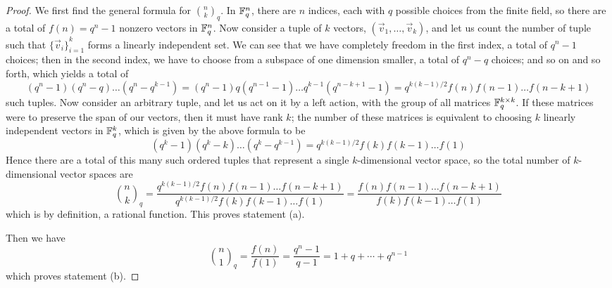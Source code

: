 \begin{proof}
    We first find the general formula for \(\binom{n}{k}_q\).
    In \(\mathbb{F}_q^n\), there are \(n\) indices, each with \(q\) possible choices from the finite field,
    so there are a total of \(f(n) = q^n - 1\) nonzero vectors in \(\mathbb{F}_q^n\).
    Now consider a tuple of \(k\) vectors, \((\vec{v}_1,\hdots,\vec{v}_k)\),
    and let us count the number of tuple
    such that \({\{\vec{v}_i\}}_{i=1}^k\) forms a linearly independent set.
    We can see that we have completely freedom in the first index, a total of \(q^n - 1\) choices;
    then in the second index, we have to choose from a subspace of one dimension smaller,
    a total of \(q^n - q\) choices;
    and so on and so forth, which yields a total of
    \begin{equation*}
        (q^n - 1)(q^n - q)\hdots(q^n - q^{k-1})
        = (q^n - 1) q(q^{n-1} - 1) \hdots q^{k-1}(q^{n-k+1} - 1)
        = q^{k(k-1)/2} f(n)f(n-1) \hdots f(n-k+1)
    \end{equation*}
    such tuples.
    Now consider an arbitrary tuple,
    and let us act on it by a left action,
    with the group of all matrices \(\mathbb{F}_q^{k \times k}\).
    If these matrices were to preserve the span of our vectors,
    then it must have rank \(k\);
    the number of these matrices is equivalent to
    choosing \(k\) linearly independent vectors in \(\mathbb{F}_q^k\),
    which is given by the above formula to be
    \begin{equation*}
        (q^k - 1)(q^k - k)\hdots(q^k - q^{k-1})
        = q^{k(k-1)/2} f(k)f(k-1) \hdots f(1)
    \end{equation*}
    Hence there are a total of this many such ordered tuples
    that represent a single \(k\)-dimensional vector space,
    so the total number of \(k\)-dimensional vector spaces are
    \begin{equation*}
        \binom{n}{k}_q
        = \frac{q^{k(k-1)/2} f(n)f(n-1) \hdots f(n-k+1)}{q^{k(k-1)/2} f(k)f(k-1) \hdots f(1)}
        = \frac{ f(n)f(n-1) \hdots f(n-k+1)}{f(k)f(k-1) \hdots f(1)}
    \end{equation*}
    which is by definition, a rational function.
    This proves statement (a).

    Then we have
    \begin{equation*}
        \binom{n}{1}_q = \frac{f(n)}{f(1)} = \frac{q^n - 1}{q - 1}
        = 1 + q + \cdots + q^{n-1}
    \end{equation*}
    which proves statement (b).


\end{proof}
